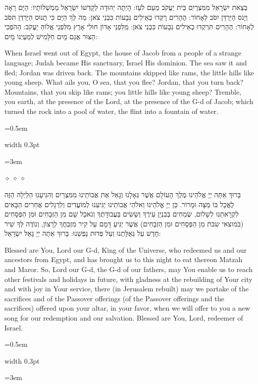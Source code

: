 \documentclass[11pt, openany]{book}
\newlength{\bidiHebWidth}
\newlength{\bidiEngWidth}
\newenvironment{bilingual}{%
  \par\vspace{4pt}%
}{%
  \noindent
  \begin{minipage}[t]{\bidiEngWidth}
    \setstretch{1.4}\emergencystretch=0.5em\normalsize
    \usebox{\bidiEngBox}
  \end{minipage}%
  \hfill
  {\color{sedergold}\vrule width 0.3pt}%
  \hfill
  \begin{minipage}[t]{\bidiHebWidth}
    \begingroup\hebrewfont\TeXXeTstate=1\beginR
    \large\setstretch{1.4}\emergencystretch=3em\tolerance=9999\parindent=0pt\relax
    \usebox{\bidiHebBox}
    \endR\endgroup
  \end{minipage}%
  \par\vspace{2pt}%
}
\newenvironment{hebrewcol}{%
  \begin{lrbox}{\bidiHebBox}\begin{minipage}{\bidiHebWidth}%
}{%
  \end{minipage}\end{lrbox}%
}
\newenvironment{englishcol}{%
  \begin{lrbox}{\bidiEngBox}\begin{minipage}{\bidiEngWidth}%
}{%
  \end{minipage}\end{lrbox}%
}
\newcommand{\parasep}{%
  \par\vspace{3pt}
  \begin{center}
    \textcolor{sedergold!50}{\tiny$\diamond\;\diamond\;\diamond$}
  \end{center}
  \par\vspace{3pt}
}
\begin{document}
\begin{bilingual}
\begin{hebrewcol}
בְּצֵאת יִשְׂרָאֵל מִמִּצְרָיִִם בֵּית יַעֲקֹב מֵעַם לֹעֵז: הָיְתָה יְהוּדָה לְקָדְשׁוֹ יִשְׂרָאֵל מַמְשְׁלוֹתָיו: הַיָּם רָאָה וַיָּנֹס הַיַּרְדֵּן יִסֹּב לְאָחוֹר: הֶהָרִים רָקְדוּ כְאֵילִים גְּבָעוֹת כִּבְנֵי צֹאן: מַה לְּךָ הַיָּם כִּי תָנוּס הַיַּרְדֵּן תִּסֹּב לְאָחוֹר: הֶהָרִים תִּרְקְדוּ כְאֵילִים גְּבָעוֹת כִּבְנֵי צֹאן: מִִלִּפְנֵי אָדוֹן חוּלִי אָרֶץ מִלִּפְנֵי אֱלוֹהַּ יַעֲקֹב: הַהֹפְכִי הַצּוּר אֲגַם מָיִם חַלָּמִישׁ לְמַעְיְנוֹ מָיִם:
\end{hebrewcol}
\begin{englishcol}
When Israel went out of Egypt, the house of Jacob from a people of a strange language; Judah became His sanctuary, Israel His dominion. The sea saw it and fled; Jordan was driven back. The mountains skipped like rams, the little hills like young sheep. What ails you, O sea, that you flee? Jordan, that you turn back? Mountains, that you skip like rams; you little hills like young sheep? Tremble, you earth, at the presence of the Lord, at the presence of the G-d of Jacob; which turned the rock into a pool of water, the flint into a fountain of water.
\end{englishcol}
\end{bilingual}
\parasep

\begin{bilingual}
\begin{hebrewcol}
בָּרוּךְ אַתָּה יְיָ אֱלֹהֵינוּ מֶלֶךְ הָעוֹלָם אֲשֶׁר גְּאָלָנוּ וְגָאַל אֶת אֲבוֹתֵינוּ מִמִּצְרַיִם וְהִגִּיעָנוּ הַלַּיְלָה הַזֶּה לֶאֱכָל בּוֹ מַצָּה וּמָרוֹר. כֵּן יְיָ אֱלֹהֵינוּ וֵאלֹהֵי אֲבוֹתֵינוּ יַגִּיעֵנוּ לְמוֹעֲדִים וְלִרְגָלִים אֲחֵרִים הַבָּאִים לִקְרָאתֵנוּ לְשָׁלוֹם, שְׂמֵחִים בְּבִנְיַן עִירֶךָ וְשָׂשִׂים בַּעֲבוֹדָתֶךָ וְנֹאכַל שָׁם מִן הַזְּבָחִים וּמִן הַפְּסָחִים (במוצאי שבת מִן הַפְּסָחִים וּמִן הַזְבָחִים) אֲשֶׁר יַגִּיעַ דָּמָם עַל קִיר מִזְבַּחֲךָ לְרָצוֹן, וְנוֹדֶה לְּךָ שִׁיר חָדָשׁ עַל גְּאֻלָּתֵנוּ וְעַל פְּדוּת נַפְשֵׁנוּ: בָּרוּךְ אַתָּה יְיָ גָּאַל יִשְׂרָאֵל:
\end{hebrewcol}
\begin{englishcol}
Blessed are You, Lord our G-d, King of the Universe, who redeemed us and our ancestors from Egypt, and has brought us to this night to eat thereon Matzah and Maror. So, Lord our G-d, the G-d of our fathers, may You enable us to reach other festivals and holidays in future, with gladness at the rebuilding of Your city and with joy in Your service, there (in Jerusalem rebuilt) may we partake of the sacrifices and of the Passover offerings (of the Passover offerings and the sacrifices) offered upon your altar, in your favor, when we will offer to you a new song for our redemption and our salvation. Blessed are You, Lord, redeemer of Israel.
\end{englishcol}
\end{bilingual}
\end{document}
